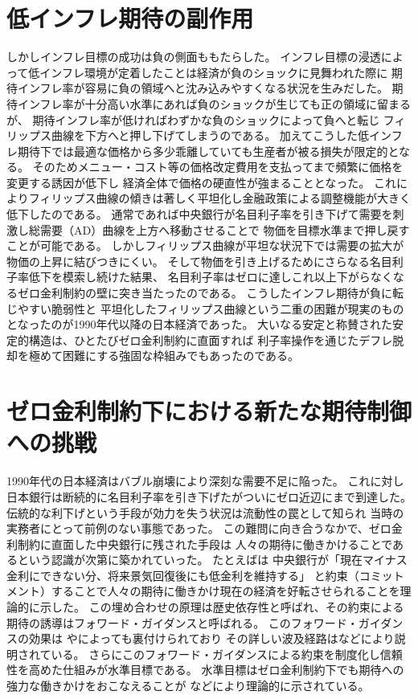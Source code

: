 \section{低インフレ期待の副作用}
\label{sec:chapter2_review_side_effects_of_low_inflation}

しかしインフレ目標の成功は負の側面ももたらした。
インフレ目標の浸透によって低インフレ環境が定着したことは経済が負のショックに見舞われた際に
期待インフレ率が容易に負の領域へと沈み込みやすくなる状況を生みだした。
期待インフレ率が十分高い水準にあれば負のショックが生じても正の領域に留まるが、
期待インフレ率が低ければわずかな負のショックによって負へと転じ
フィリップス曲線を下方へと押し下げてしまうのである。
加えてこうした低インフレ期待下では最適な価格から多少乖離していても生産者が被る損失が限定的となる。
そのためメニュー・コスト等の価格改定費用を支払ってまで頻繁に価格を変更する誘因が低下し
経済全体で価格の硬直性が強まることとなった。
これによりフィリップス曲線の傾きは著しく平坦化し金融政策による調整機能が大きく低下したのである。
通常であれば中央銀行が名目利子率を引き下げて需要を刺激し総需要（AD）曲線を上方へ移動させることで
物価を目標水準まで押し戻すことが可能である。
しかしフィリップス曲線が平坦な状況下では需要の拡大が物価の上昇に結びつきにくい。
そして物価を引き上げるためにさらなる名目利子率低下を模索し続けた結果、
名目利子率はゼロに達しこれ以上下がらなくなるゼロ金利制約の壁に突き当たったのである。
こうしたインフレ期待が負に転じやすい脆弱性と
平坦化したフィリップス曲線という二重の困難が現実のものとなったのが1990年代以降の日本経済であった。
大いなる安定と称賛された安定的構造は、ひとたびゼロ金利制約に直面すれば
利子率操作を通じたデフレ脱却を極めて困難にする強固な枠組みでもあったのである。

\section{ゼロ金利制約下における新たな期待制御への挑戦}
\label{sec:chapter2_review_zlb_challenge}
1990年代の日本経済はバブル崩壊により深刻な需要不足に陥った。
これに対し日本銀行は断続的に名目利子率を引き下げたがついにゼロ近辺にまで到達した。
伝統的な利下げという手段が効力を失う状況は流動性の罠として知られ
当時の実務者にとって前例のない事態であった。
この難問に向き合うなかで、ゼロ金利制約に直面した中央銀行に残された手段は
人々の期待に働きかけることであるという認識が次第に築かれていった。
たとえば\textcite{EggertssonWoodford2003}は
中央銀行が「現在マイナス金利にできない分、将来景気回復後にも低金利を維持する」
と約束（コミットメント）することで人々の期待に働きかけ現在の経済を好転させられることを理論的に示した。
この埋め合わせの原理は歴史依存性と呼ばれ、その約束による期待の誘導はフォワード・ガイダンスと呼ばれる。
このフォワード・ガイダンスの効果は
 \textcite{ReifschneiderWilliams2000}や\textcite{JungTeranishiWatanabe2005}によっても裏付けられており
その詳しい波及経路は\textcite{ReifschneiderWilliams2000}などにより説明されている。
さらにこのフォワード・ガイダンスによる約束を制度化し信頼性を高めた仕組みが水準目標である。
水準目標はゼロ金利制約下でも期待への強力な働きかけをおこなえることが
\textcite{Woodford2012}などにより理論的に示されている。


